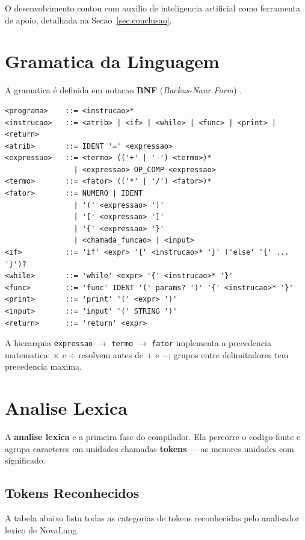 \documentclass[12pt, a4paper]{article}
\begin{document}
O desenvolvimento contou com auxilio de inteligencia artificial como ferramenta
de apoio, detalhada na Secao~\ref{sec:conclusao}.

\section{Gramatica da Linguagem}

A gramatica é definida em notacao \textbf{BNF}
(\textit{Backus-Naur Form}) \cite{louden1997}.

\begin{lstlisting}[style=nova, caption={Gramatica BNF de NovaLang}]
<programa>    ::= <instrucao>*
<instrucao>   ::= <atrib> | <if> | <while> | <func> | <print> | <return>
<atrib>       ::= IDENT '=' <expressao>
<expressao>   ::= <termo> (('+' | '-') <termo>)*
                | <expressao> OP_COMP <expressao>
<termo>       ::= <fator> (('*' | '/') <fator>)*
<fator>       ::= NUMERO | IDENT
                | '(' <expressao> ')'
                | '[' <expressao> ']'
                | '{' <expressao> '}'
                | <chamada_funcao> | <input>
<if>          ::= 'if' <expr> '{' <instrucao>* '}' ('else' '{' ... '}')?
<while>       ::= 'while' <expr> '{' <instrucao>* '}'
<func>        ::= 'func' IDENT '(' params? ')' '{' <instrucao>* '}'
<print>       ::= 'print' '(' <expr> ')'
<input>       ::= 'input' '(' STRING ')'
<return>      ::= 'return' <expr>
\end{lstlisting}

A hierarquia \texttt{expressao} $\rightarrow$ \texttt{termo} $\rightarrow$
\texttt{fator} implementa a precedencia matematica: $\times$ e $\div$
resolvem antes de $+$ e $-$; grupos entre delimitadores tem precedencia maxima.

\section{Analise Lexica}

A \textbf{analise lexica} e a primeira fase do compilador. Ela percorre o
codigo-fonte e agrupa caracteres em unidades chamadas \textbf{tokens}
— as menores unidades com significado.

\subsection{Tokens Reconhecidos}

A tabela abaixo lista todas as categorias de tokens reconhecidas pelo analisador lexico de NovaLang.
\end{document}
